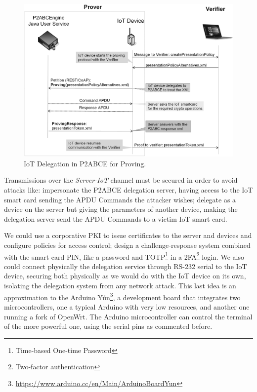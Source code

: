 \begin{figure}[bth]
	\begin{center}
		\includegraphics[width=\linewidth]{gfx/UML/DelegationProving}
	\end{center}
	\caption{IoT Delegation in P2ABCE for Proving.}
	\label{fig:DelegationProving}
\end{figure}

Transmissions over the \textit{Server-IoT} channel must be secured in order to avoid attacks like: impersonate the P2ABCE delegation server, having access to the IoT smart card sending the APDU Commands the attacker wishes; delegate as a device on the server but giving the parameters of another device, making the delegation server send the APDU Commands to a victim IoT smart card.


We could use a corporative PKI to issue certificates to the server and devices and configure policies for access control; design a challenge-response system combined with the smart card PIN, like a password and TOTP\footnote{Time-based One-time Password} in a 2FA\footnote{Two-factor authentication} login. We also could connect physically the delegation service through RS-232 serial to the IoT device, securing both physically as we would do with the IoT device on its own, isolating the delegation system from any network attack. This last idea is an approximation to the Arduino Yún\footnote{\url{https://www.arduino.cc/en/Main/ArduinoBoardYun}}, a development board that integrates two microcontrollers, one a typical Arduino with very low resources, and another one running a fork of OpenWrt. The Arduino microcontroller can control the terminal of the more powerful one, using the serial pins as commented before.

